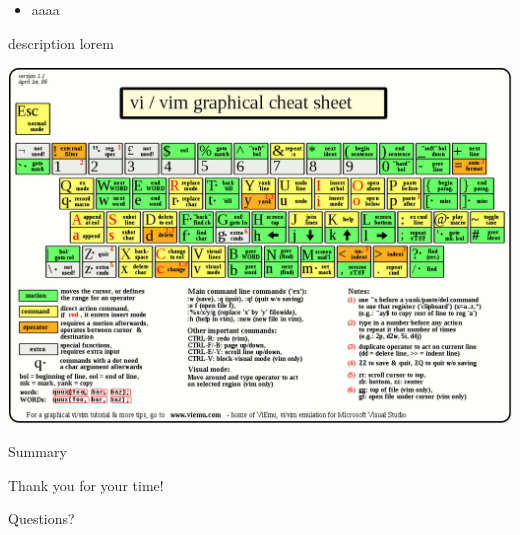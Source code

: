 \documentclass{beamer}
\begin{document}
\begin{frame}
    \begin{itemize}
        \item aaaa
    \end{itemize}
    \begin{description}
        \item description lorem
    \end{description}
\end{frame}

\begin{frame}
    \begin{center}
        \includegraphics[width=1\textwidth]{images/cheat-sheet.png}
    \end{center}
\end{frame}

\begin{frame}{Summary}
\end{frame}

\begin{frame}
    \begin{center}
        \huge Thank you for your time!
    \end{center}
    \begin{center}
        Questions?
    \end{center}
\end{frame}
\end{document}
